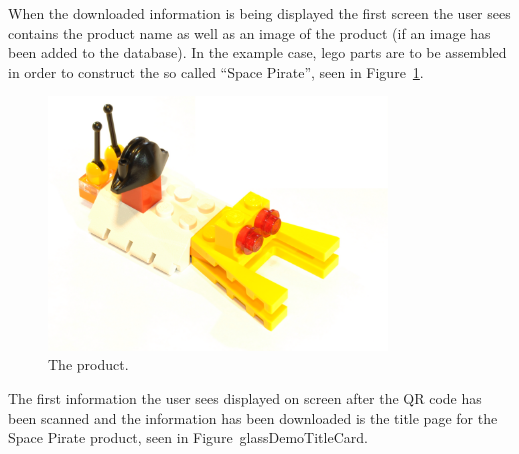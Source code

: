 When the downloaded information is being displayed the first screen the user sees contains the product name as well as an image of the product (if an image has been added to the database). In the example case, lego parts are to be assembled in order to construct the so called ``Space Pirate'', seen in Figure~\ref{glassDemoRaw}.

	\begin{figure}[ht!]
		\centering
		\includegraphics[width=90mm]{images/rawImages/BILD_6}
		\caption{The product.}
		\label{glassDemoRaw}
	\end{figure}

The first information the user sees displayed on screen after the QR code has been scanned and the information has been downloaded is the title page for the Space Pirate product, seen in Figure~{glassDemoTitleCard}.

	
